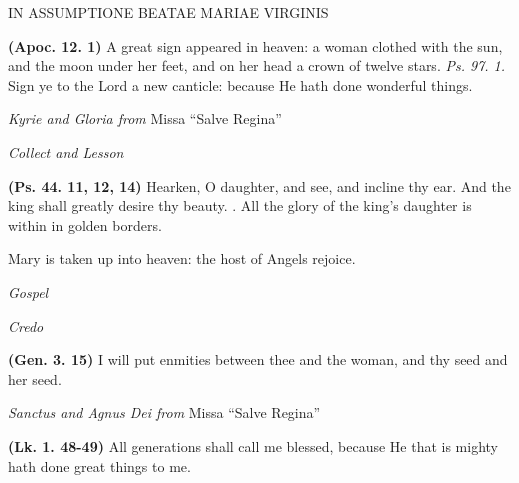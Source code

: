 \documentclass[11pt]{article} %
\begin{document}
\begin{center}\begin{huge}\textsc{IN ASSUMPTIONE BEATAE MARIAE VIRGINIS}\end{huge}\end{center}


\def\greinitialformat#1{%
{\fontsize{34}{34}\selectfont #1}%
}

\textbf{(Apoc. 12. 1)} A great sign appeared in heaven: a woman clothed with the sun, and the moon under her feet, and on her head a crown of twelve stars. \emph{Ps. 97. 1.} Sign ye to the Lord a new canticle: because He hath done wonderful things.

\vskip10pt

\emph{Kyrie and Gloria from} Missa ``Salve Regina''

\emph{Collect and Lesson}

\vskip10pt

\textbf{(Ps. 44. 11, 12, 14)} Hearken, O daughter, and see, and incline thy ear. And the king shall greatly desire thy beauty. \Vbar{}. All the glory of the king's daughter is within in golden borders.

\vskip10pt

Mary is taken up into heaven: the host of Angels rejoice.

\vskip10pt

\emph{Gospel}

\emph{Credo}

\vskip10pt


\textbf{(Gen. 3. 15)} I will put enmities between thee and the woman, and thy seed and her seed.

\vskip10pt

\emph{Sanctus and Agnus Dei from} Missa ``Salve Regina''

\vskip10pt


\textbf{(Lk. 1. 48-49)} All generations shall call me blessed, because He that is mighty hath done great things to me.
\end{document}
